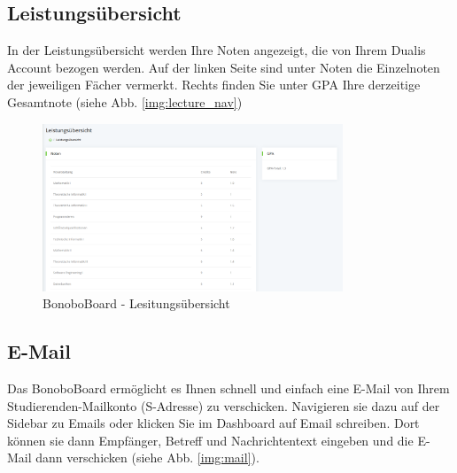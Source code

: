 \documentclass[a4paper,11pt]{scrartcl}
\begin{document}
\subsection{Leistungsübersicht}
In der Leistungsübersicht werden Ihre Noten angezeigt, die von Ihrem Dualis Account bezogen werden. Auf der linken Seite sind unter \frqq{}Noten\flqq{} die Einzelnoten der jeweiligen Fächer vermerkt. Rechts finden Sie unter \frqq{}GPA\flqq{} Ihre derzeitige Gesamtnote (siehe Abb. \ref{img:lecture_nav})

\begin{figure}[H]
	\begin{center}
		\includegraphics[width=0.8\textwidth]{dualis}
		\caption{BonoboBoard - Lesitungsübersicht}
		\label{img:dualis}
	\end{center}
\end{figure}
\noindent

\subsection{E-Mail}
\label{sec:email}
Das BonoboBoard ermöglicht es Ihnen schnell und einfach eine E-Mail von Ihrem Studierenden-Mailkonto (\frqq{}S-Adresse\flqq{}) zu verschicken. Navigieren sie dazu auf der Sidebar zu \frqq{}Emails\flqq{} oder klicken Sie im Dashboard auf \frqq{}Email schreiben\flqq{}. Dort können sie dann Empfänger, Betreff und Nachrichtentext eingeben und die E-Mail dann verschicken (siehe Abb. \ref{img:mail}).
 
\end{document}
